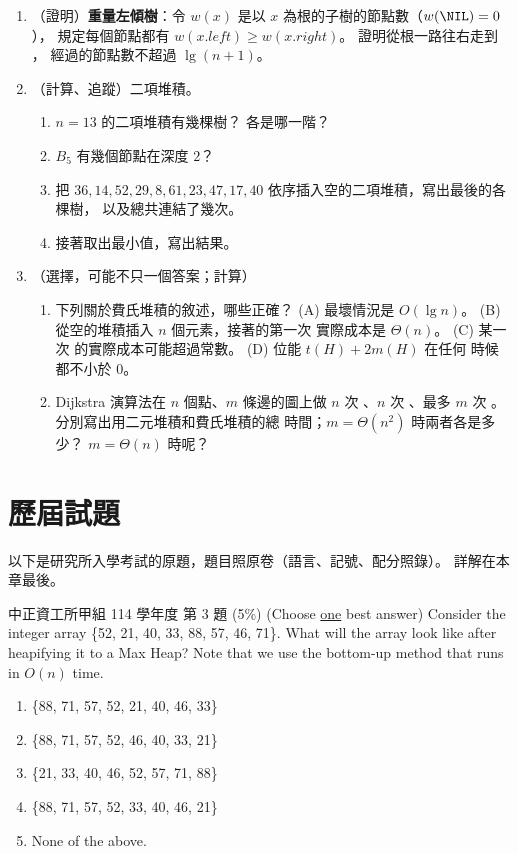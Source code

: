 \begin{enumerate}
\item\label{hp-q-wblt} （證明）\textbf{重量左傾樹}：令 $w(x)$ 是以 $x$ 為根的子樹的節點數（$w(\NIL) = 0$），
規定每個節點都有 $w(x.\mathit{left}) \ge w(x.\mathit{right})$。 證明從根一路往右走到 \NIL，
經過的節點數不超過 $\lg(n + 1)$。

\item （計算、追蹤）二項堆積。
\begin{enumerate}
\item $n = 13$ 的二項堆積有幾棵樹？ 各是哪一階？
\item $B_5$ 有幾個節點在深度 $2$？
\item 把 $36, 14, 52, 29, 8, 61, 23, 47, 17, 40$ 依序插入空的二項堆積，寫出最後的各棵樹，
以及總共連結了幾次。
\item 接著取出最小值，寫出結果。
\end{enumerate}

\item （選擇，可能不只一個答案；計算）
\begin{enumerate}
\item 下列關於費氏堆積的敘述，哪些正確？ (A)  最壞情況是 $O(\lg n)$。
(B) 從空的堆積插入 $n$ 個元素，接著的第一次  實際成本是 $\Theta(n)$。
(C) 某一次  的實際成本可能超過常數。 (D) 位能 $t(H) + 2m(H)$ 在任何
時候都不小於 $0$。
\item Dijkstra 演算法在 $n$ 個點、$m$ 條邊的圖上做 $n$ 次 、$n$ 次
、最多 $m$ 次 。 分別寫出用二元堆積和費氏堆積的總
時間；$m = \Theta(n^2)$ 時兩者各是多少？ $m = \Theta(n)$ 時呢？
\end{enumerate}
\end{enumerate}

\section{歷屆試題}
\label{sec:hp-pastexam}

以下是研究所入學考試的原題，題目照原卷（語言、記號、配分照錄）。 詳解在本章最後。

\begin{pastexam}[label={px:hp-1}]{中正資工所甲組 114 學年度 第 3 題}
(5\%) (Choose \underline{one} best answer) Consider the integer array \{52, 21, 40, 33, 88, 57, 46, 71\}. What will the array look like after heapifying it to a Max Heap? Note that we use the bottom-up method that runs in $O(n)$ time.
\begin{enumerate}[label=(\alph*)]
\item \{88, 71, 57, 52, 21, 40, 46, 33\}
\item \{88, 71, 57, 52, 46, 40, 33, 21\}
\item \{21, 33, 40, 46, 52, 57, 71, 88\}
\item \{88, 71, 57, 52, 33, 40, 46, 21\}
\item None of the above.
\end{enumerate}
\end{pastexam}

